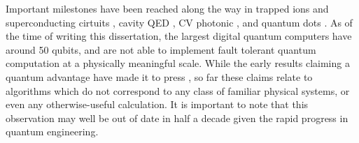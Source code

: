 	Important milestones have been reached along the way in trapped ions \cite{} and superconducting cirtuits \cite{}, cavity QED \cite{}, CV photonic \cite{Xanadu, BosonSampling}, and quantum dots \cite{}.
	As of the time of writing this dissertation, the largest digital quantum computers have around 50 qubits, and are not able to implement fault tolerant quantum computation at a physically meaningful scale.
	While the early results claiming a quantum advantage have made it to press \cite{}, so far these claims relate to algorithms which do not correspond to any class of familiar physical systems, or even any otherwise-useful calculation.
	It is important to note that this observation may well be out of date in half a decade given the rapid progress in quantum engineering.


